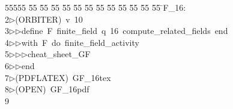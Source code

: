 %
%
\begin{tabbing}
55555 \= 55 \= 55 \= 55 \= 55 \= 55 \= 55 \= 55 \= 55 \= 55 \= 55 \= 55 \= 55 \= \>F\_16:\\[0pt]
2\>$\triangleright$\>(ORBITER)\ v\ 10\ \\[0pt]
3\>$\triangleright$\>$\triangleright$\>define\ F\ finite\_field\ q\ 16\ compute\_related\_fields\ end\ \\[0pt]
4\>$\triangleright$\>$\triangleright$\>with\ F\ do\ finite\_field\_activity\ \\[0pt]
5\>$\triangleright$\>$\triangleright$\>$\triangleright$\>cheat\_sheet\_GF\ \\[0pt]
6\>$\triangleright$\>$\triangleright$\>end\\[0pt]
7\>$\triangleright$\>(PDFLATEX)\ GF\_16tex\\[0pt]
8\>$\triangleright$\>(OPEN)\ GF\_16pdf\\[0pt]
9\>\end{tabbing}

